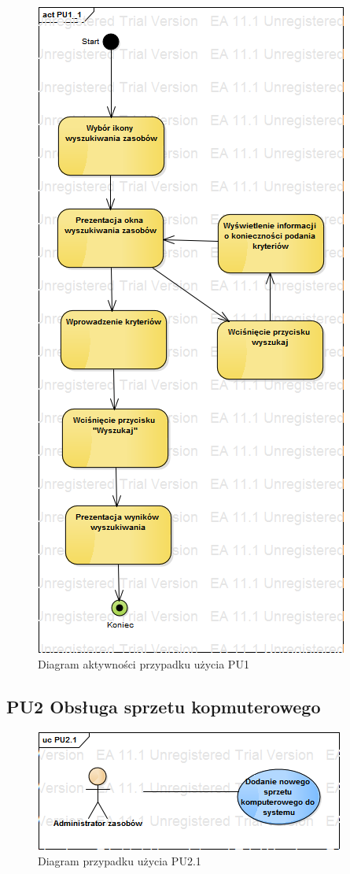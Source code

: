 \begin{figure}[h!]
	\centering
	\includegraphics[scale=0.6]{img/diagrams/activityDiagrams/PU1_1}
	\caption{Diagram aktywności przypadku użycia PU1 \label{fig:labelADPU1}}
\end{figure}


\subsection{PU2 Obsługa sprzetu kopmuterowego} \label{pu2}

\begin{figure}[h!]
	\centering
	\includegraphics[scale=0.6]{img/diagrams/useCaseDiagrams/PU2_1.png}
	\caption{Diagram przypadku użycia PU2.1 \label{fig:labelUCPU2.1}}
\end{figure}

